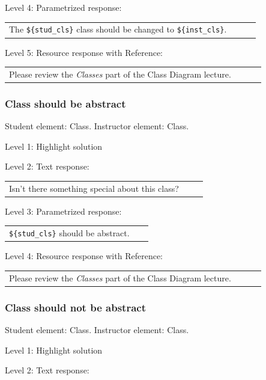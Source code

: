 \noindent Level 4: Parametrized response: \medskip

\begin{tabular}{|p{0.9\linewidth}}
The \verb|${stud_cls}| class should be changed to \verb|${inst_cls}|.
\end{tabular} \medskip

\noindent Level 5: Resource response with Reference: \medskip

\begin{tabular}{|p{0.9\linewidth}}
Please review the \textit{Classes} part of the Class Diagram lecture.
\end{tabular} \medskip


\subsubsection{Class should be abstract}

Student element: Class. Instructor element: Class. \medskip

\noindent Level 1: Highlight solution  \medskip

\noindent Level 2: Text response: \medskip

\begin{tabular}{|p{0.9\linewidth}}
Isn't there something special about this class?
\end{tabular} \medskip

\noindent Level 3: Parametrized response: \medskip

\begin{tabular}{|p{0.9\linewidth}}
\verb|${stud_cls}| should be abstract.
\end{tabular} \medskip

\noindent Level 4: Resource response with Reference: \medskip

\begin{tabular}{|p{0.9\linewidth}}
Please review the \textit{Classes} part of the Class Diagram lecture.
\end{tabular} \medskip


\subsubsection{Class should not be abstract}

Student element: Class. Instructor element: Class. \medskip

\noindent Level 1: Highlight solution  \medskip

\noindent Level 2: Text response: \medskip

